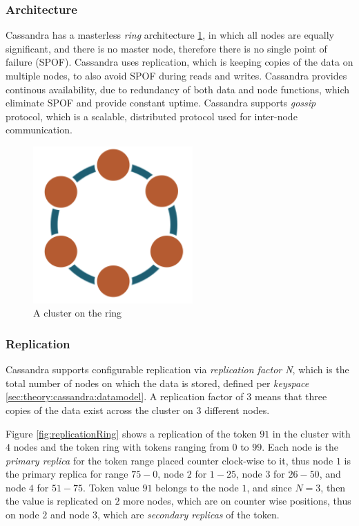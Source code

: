 \subsubsection{Architecture}
Cassandra has a masterless \emph{ring} architecture \ref{fig:archCluster}, in which all nodes are equally significant, and there is no master node, therefore there is no single point of failure (SPOF). Cassandra uses replication, which is keeping copies of the data on multiple nodes, to also avoid SPOF during reads and writes. Cassandra provides continous availability, due to redundancy of both data and node functions, which eliminate SPOF and provide constant uptime.
Cassandra supports \emph{gossip} protocol, which is a scalable, distributed protocol used for inter-node communication.

\begin{figure}[h]
	\centering
	\includegraphics[height=60mm]{images/cassandra-ring.png}\hspace{10mm}
	\caption{A cluster on the ring}
	\label{fig:archCluster}
\end{figure}

\subsubsection{Replication}
Cassandra supports configurable replication via \emph{replication factor N}, which is the total number of nodes on which the data is stored, defined per \emph{keyspace} \ref{sec:theory:cassandra:datamodel}. A replication factor of $3$ means that three copies of the data exist across the cluster on $3$ different nodes.

Figure \ref{fig:replicationRing} shows a replication of the token $91$ in the cluster with $4$ nodes and the token ring with tokens ranging from $0$ to $99$. 
Each node is the \emph{primary replica} for the token range placed counter clock-wise to it, thus node $1$ is the primary replica for range $75-0$, node $2$ for $1-25$, node $3$ for $26-50$, and node $4$ for $51-75$. 
Token value $91$ belongs to the node $1$, and since $N=3$, then the value is replicated on $2$ more nodes, which are on counter wise positions, thus on node $2$ and node $3$, which are \emph{secondary replicas} of the token. 

